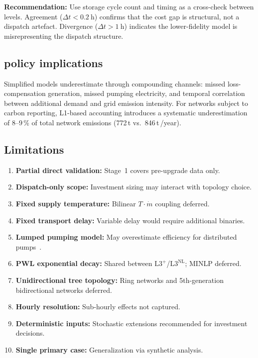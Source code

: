 \documentclass[review,3p]{elsarticle}
\newcommand{\Lplus}{\mathrm{L3}^{+}}
\newcommand{\Lnl}{\mathrm{L3}^{\mathrm{NL}}}
\begin{document}
\textbf{Recommendation:} Use storage cycle count and timing as a
cross-check between levels. Agreement ($\Delta t < \SI{0.2}{\hour}$)
confirms that the cost gap is structural, not a dispatch artefact.
Divergence ($\Delta t > \SI{1}{\hour}$) indicates the lower-fidelity
model is misrepresenting the dispatch structure.

\subsection{ policy implications}
\label{sec:disc_co2}

Simplified models underestimate  through compounding
channels: missed loss-compensation generation, missed pumping
electricity, and temporal correlation between additional demand and
grid emission intensity. For networks subject to carbon reporting,
L1-based accounting introduces a systematic underestimation of
$8$--$9\,\%$ of total network emissions (772\,t vs.\ 846\,t\,/year).

\subsection{Limitations}
\label{sec:discussion_limitations}

\begin{enumerate}[nosep]
  \item \textbf{Partial direct validation:} Stage~1 covers
        pre-upgrade data only.
  \item \textbf{Dispatch-only scope:} Investment sizing may interact
        with topology choice.
  \item \textbf{Fixed supply temperature:} Bilinear
        $T \cdot \dot{m}$ coupling deferred.
  \item \textbf{Fixed transport delay:} Variable delay would require
        additional binaries.
  \item \textbf{Lumped pumping model:} May overestimate efficiency for
        distributed pumps~\cite{Hari2024}.
  \item \textbf{PWL exponential decay:} Shared between
        $\Lplus$/$\Lnl$; MINLP deferred.
  \item \textbf{Unidirectional tree topology:} Ring networks and
        5th-generation bidirectional networks deferred.
  \item \textbf{Hourly resolution:} Sub-hourly effects not captured.
  \item \textbf{Deterministic inputs:} Stochastic extensions
        recommended for investment decisions.
  \item \textbf{Single primary case:} Generalization via synthetic
        analysis.
\end{enumerate}
\end{document}
